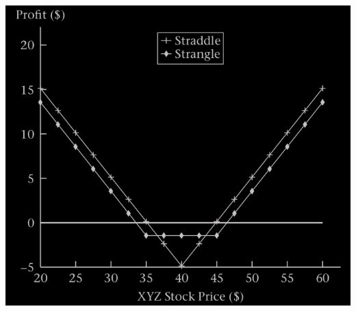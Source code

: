 \begin{frame}[fragile,t]
	\begin{center}
		\includegraphics[scale=0.25]{figs/Figure-3-11.png}
	\end{center}
	\myEnd
\end{frame}
